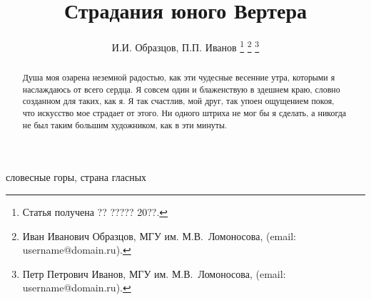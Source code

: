 \documentclass[journal]{INJOITrus}
\begin{document}
\title{Страдания юного Вертера}
\author{%
	И.И. Образцов, П.П. Иванов%
	\thanks{Статья получена ?? ????? 20??.} %
	\thanks{Иван Иванович Образцов, МГУ им. М.В.~Ломоносова, (email: username@domain.ru).}%
	\thanks{Петр Петрович Иванов, МГУ им. М.В.~Ломоносова, (email: username@domain.ru).}%
}

\maketitle


\begin{abstract}
Душа моя озарена неземной радостью, как эти чудесные весенние утра, которыми я наслаждаюсь от всего сердца. Я совсем один и блаженствую в здешнем краю, словно созданном для таких, как я. Я так счастлив, мой друг, так упоен ощущением покоя, что искусство мое страдает от этого. Ни одного штриха не мог бы я сделать, а никогда не был таким большим художником, как в эти минуты.
\end{abstract}

\begin{IEEEkeywords}
словесные горы, страна гласных
\end{IEEEkeywords}
\end{document}
